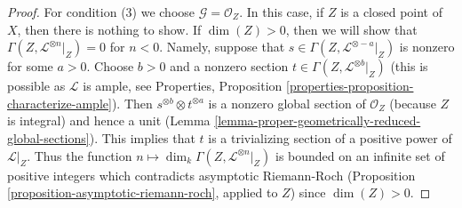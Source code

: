 \begin{proof}
\medskip\noindent
For condition (3) we choose $\mathcal{G} = \mathcal{O}_Z$.
In this case, if $Z$ is a closed point of $X$, then there is
nothing to show. If $\dim(Z) > 0$, then we will show that
$\Gamma(Z, \mathcal{L}^{\otimes n}|_Z) = 0$
for $n < 0$. Namely, suppose that
$s\in\Gamma(Z,\mathcal L^{\otimes -a}|_Z)$ is nonzero for some $a>0$.
Choose $b>0$ and a nonzero section
$t\in\Gamma(Z,\mathcal L^{\otimes b}|_Z)$ (this is possible as
$\mathcal{L}$ is ample, see Properties, Proposition
\ref{properties-proposition-characterize-ample}). Then
$s^{\otimes b}\otimes t^{\otimes a}$ is a nonzero global section of
$\mathcal{O}_Z$
(because $Z$ is integral) and hence
a unit (Lemma \ref{lemma-proper-geometrically-reduced-global-sections}).
This implies that $t$ is a trivializing section
of a positive power of $\mathcal{L}|_Z$.
Thus the function
$n \mapsto \dim_k \Gamma(Z, \mathcal{L}^{\otimes n}|_Z)$
is bounded on an infinite set of positive integers which contradicts
asymptotic Riemann-Roch
(Proposition \ref{proposition-asymptotic-riemann-roch}, applied to $Z$)
since $\dim(Z) > 0$.
\end{proof}

